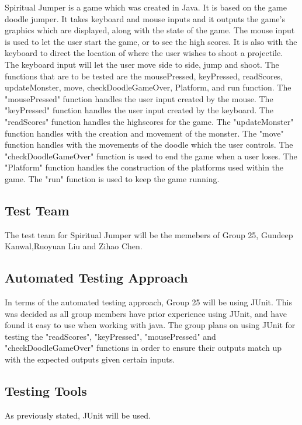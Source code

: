 \documentclass[12pt, titlepage]{article}
\begin{document}
Spiritual Jumper is a game which was created in Java. It is based on the game doodle jumper. It takes keyboard and mouse inputs and it outputs the game's graphics which are displayed, along with the state of the game. The mouse input is used to let the user start the game, or to see the high scores. It is also with the keyboard to direct the location of where the user wishes to shoot a projectile. The keyboard input will let the user move side to side, jump and shoot. The functions that are to be tested are the mousePressed, keyPressed, readScores, updateMonster, move, checkDoodleGameOver, Platform, and run function. The "mousePressed" function handles the user input created by the mouse. The "keyPressed" function handles the user input created by the keyboard. The "readScores" function handles the highscores for the game. The "updateMonster" function handles with the creation and movement of the monster. The "move" function handles with the movements of the doodle which the user controls. The "checkDoodleGameOver" function is used to end the game when a user loses. The "Platform" function handles the construction of the platforms used within the game. The "run" function is used to keep the game running.

\subsection{Test Team}

The test team for Spiritual Jumper will be the memebers of Group 25, Gundeep Kanwal,Ruoyuan Liu and Zihao Chen. 

\subsection{Automated Testing Approach}

In terms of the automated testing approach, Group 25 will be using JUnit. This was decided as all group members have prior experience using JUnit, and have found it easy to use when working with java. The group plans on using JUnit for testing the "readScores", "keyPressed", "mousePressed" and "checkDoodleGameOver" functions in order to ensure their outputs match up with the expected outputs given certain inputs. 

\subsection{Testing Tools}

As previously stated, JUnit will be used. 
\end{document}
